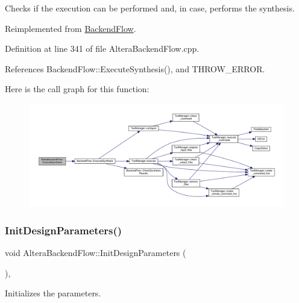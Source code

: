 Checks if the execution can be performed and, in case, performs the synthesis. 



Reimplemented from \hyperlink{classBackendFlow_af0e8f1973185540298eaa3ac4bee3b2c}{Backend\+Flow}.



Definition at line 341 of file Altera\+Backend\+Flow.\+cpp.



References Backend\+Flow\+::\+Execute\+Synthesis(), and T\+H\+R\+O\+W\+\_\+\+E\+R\+R\+OR.

Here is the call graph for this function\+:
\nopagebreak
\begin{figure}[H]
\begin{center}
\leavevmode
\includegraphics[width=350pt]{d2/d83/classAlteraBackendFlow_a02d5cfd65ba8c97fd8b3c9781014c22c_cgraph}
\end{center}
\end{figure}
\mbox{\label{classAlteraBackendFlow_aef7d0e07aaf000ba9d93cdde6761daeb}} 
\subsubsection{\texorpdfstring{Init\+Design\+Parameters()}{InitDesignParameters()}}
{\footnotesize\ttfamily void Altera\+Backend\+Flow\+::\+Init\+Design\+Parameters (\begin{DoxyParamCaption}{ }\end{DoxyParamCaption})\hspace{0.3cm}{\ttfamily [override]}, {\ttfamily [virtual]}}



Initializes the parameters. 



